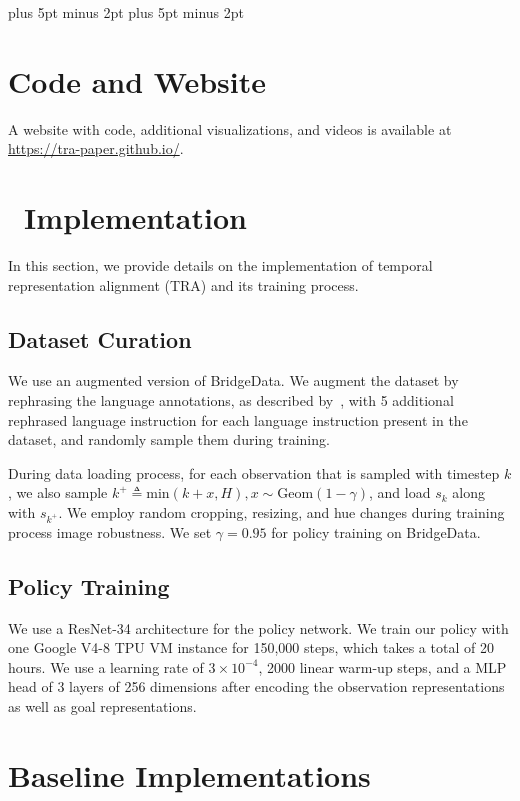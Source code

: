\label{sec:appendix}

\textfloatsep=12pt plus 5pt minus 2pt
\intextsep=12pt plus 5pt minus 2pt

\section{Code and Website}
\label{sec:code}

A website with code, additional visualizations, and videos is available at \url{https://tra-paper.github.io/}.

\section{\Method~Implementation}
\label{app:tra_impl}

In this section, we provide details on the implementation of temporal representation alignment (TRA) and its training process.

\subsection{Dataset Curation}\label{sec:dataset}

We use an augmented version of BridgeData. We augment the dataset by rephrasing the language annotations, as described by~\citep{myers2023goal}, with 5 additional rephrased language instruction for each language instruction present in the dataset, and randomly sample them during training.

During data loading process, for each observation that is sampled with timestep $k$, we also sample $k^{+} \triangleq \text{min}(k+x,H), x\sim\text{Geom}(1-\gamma)$, and load $s_{k}$ along with $s_{k^{+}}$.
We employ random cropping, resizing, and hue changes during training process image robustness.
 We set $\gamma=0.95$ for policy training on BridgeData.
\subsection{Policy Training}

We use a ResNet-34 architecture for the policy network.
We train our policy with one Google V4-8 TPU VM instance for 150,000 steps, which takes a total of 20 hours.
We use a learning rate of $3 \times 10^{-4}$, 2000 linear warm-up steps, and a MLP head of 3 layers of 256 dimensions after encoding the observation representations as well as goal representations.

\section{Baseline Implementations}
\label{app:baselines}

